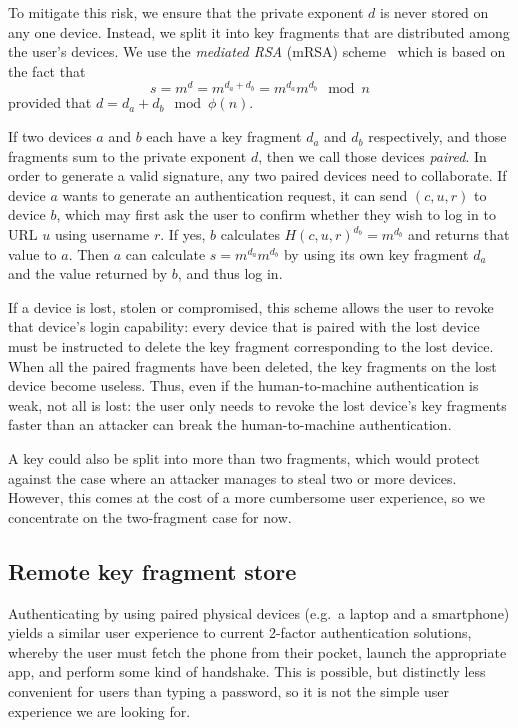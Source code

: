To mitigate this risk, we ensure that the private exponent $d$ is never stored on any one device.
Instead, we split it into key fragments that are distributed among the user's devices. We use the
\emph{mediated RSA} (mRSA) scheme~\cite{Boneh01} which is based on the fact that
$$s = m^d = m^{d_a + d_b} = m^{d_a} m^{d_b} \mod n$$ provided that $d = d_a + d_b \mod \phi(n)$.

If two devices $a$ and $b$ each have a key fragment $d_a$ and $d_b$ respectively, and those
fragments sum to the private exponent $d$, then we call those devices \emph{paired}. In order to
generate a valid signature, any two paired devices need to collaborate. If device $a$ wants to
generate an authentication request, it can send $(c, u, r)$ to device $b$, which may first ask the
user to confirm whether they wish to log in to URL $u$ using username $r$. If yes, $b$ calculates
$H(c, u, r)^{d_b} = m^{d_b}$ and returns that value to $a$. Then $a$ can calculate
$s = m^{d_a} m^{d_b}$ by using its own key fragment $d_a$ and the value returned by $b$, and thus
log in.

If a device is lost, stolen or compromised, this scheme allows the user to revoke that device's
login capability: every device that is paired with the lost device must be instructed to delete the
key fragment corresponding to the lost device. When all the paired fragments have been deleted, the
key fragments on the lost device become useless. Thus, even if the human-to-machine authentication
is weak, not all is lost: the user only needs to revoke the lost device's key fragments faster than
an attacker can break the human-to-machine authentication.

A key could also be split into more than two fragments, which would protect against the case where
an attacker manages to steal two or more devices. However, this comes at the cost of a more
cumbersome user experience, so we concentrate on the two-fragment case for now.

\subsection{Remote key fragment store}

Authenticating by using paired physical devices (e.g.\ a laptop and a smartphone) yields a similar
user experience to current 2-factor authentication solutions, whereby the user must fetch the phone
from their pocket, launch the appropriate app, and perform some kind of handshake. This is
possible, but distinctly less convenient for users than typing a password, so it is not the simple
user experience we are looking for.

